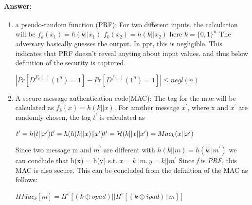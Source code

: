 \documentclass{article}
\begin{document}
        \paragraph{Answer: \newline}
        \begin{enumerate}
            \item a pseudo-random function (PRF): \newline
                For two different inputs, the calculation will be 
                $f_k(x_1)= h(k||{x_1})$\newline
                $f_k(x_2)= h(k||{x_2})$ \newline
                here $k={\{0,1\}^n}$ \newline
                The adversary basically guesses the output. In ppt, this is negligible. This indicates that PRF doesn't reveal anyting about input values. and thus below definition of the security is captured.
                \begin{center}
                    \begin{math}
                        |Pr[D^{F_k(.)}(1^n)=1]-Pr[D^{f(.)}(1^n)=1]| \leq negl(n)
                    \end{math}
                \end{center}
            
            \item A secure message authentication code(MAC): \newline
                The tag for the mac will be calculated as $f_k(x) = h(k||x)$. For another message $x^{\prime}$, where x and $x^{\prime}$ are randomly chosen, the tag $t^{\prime}$ is calculated as 
                \begin{center}
                    \begin{math}
                        t^\prime = h(t||x^\prime) \newline
                        t^\prime = h(h(k||x)||x^\prime) \newline
                        t^\prime = \mathcal{H}(k||x||x^{\prime}) = Mac_k(x||x^{\prime})
                    \end{math}
                \end{center}
                
                Since two message m and $m^{\prime}$ are different with $h(k||m) = h(k||m^{\prime})$ we can conclude that h(x) = h(y)\newline
                s.t. $x = k||m, y = k||m^{\prime} $
                Since \emph{f} is \emph{PRF}, this MAC is also secure. This can be concluded from the definition of the MAC as follows:
                \begin{center}
                    \begin{math}
                        HMac_k[m] = H^s[(k\oplus{opad})||H^s[(k\oplus{ipad})||m]]
                    \end{math}
                \end{center}
            

\end{enumerate}
\end{document}
